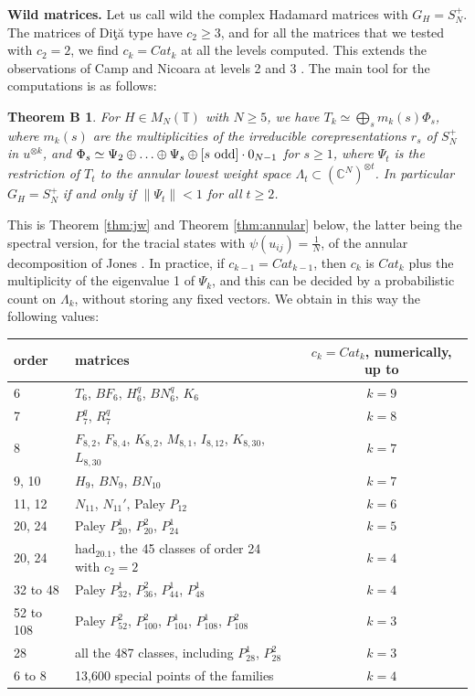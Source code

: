 \documentclass[11pt]{amsart}
\newtheorem*{thmB}{Theorem B}
\newcommand{\T}{\mathbb T}
\begin{document}
\medskip

\noindent\textbf{Wild matrices.} Let us call wild the complex Hadamard matrices with $G_H=S_N^+$. The matrices of Di\c t\u a type have $c_2\geq3$, and for all the matrices that we tested with $c_2=2$, we find $c_k=Cat_k$ at all the levels computed. This extends the observations of Camp and Nicoara at levels 2 and 3 \cite{cn}. The main tool for the computations is as follows:

\begin{thmB}
For $H\in M_N(\T)$ with $N\geq5$, we have $T_k\simeq\bigoplus_sm_k(s)\Phi_s$, where $m_k(s)$ are the multiplicities of the irreducible corepresentations $r_s$ of $S_N^+$ in $u^{\otimes k}$, and $\Phi_s\simeq\Psi_2\oplus\ldots\oplus\Psi_s\oplus[s\ {\rm odd}]\cdot0_{N-1}$ for $s\geq1$, where $\Psi_t$ is the restriction of $T_t$ to the annular lowest weight space $\Lambda_t\subset(\mathbb C^N)^{\otimes t}$. In particular $G_H=S_N^+$ if and only if $\|\Psi_t\|<1$ for all $t\geq2$.
\end{thmB}

This is Theorem \ref{thm:jw} and Theorem \ref{thm:annular} below, the latter being the spectral version, for the tracial states with $\psi(u_{ij})=\frac{1}{N}$, of the annular decomposition of Jones \cite{jo2}. In practice, if $c_{k-1}=Cat_{k-1}$, then $c_k$ is $Cat_k$ plus the multiplicity of the eigenvalue 1 of $\Psi_k$, and this can be decided by a probabilistic count on $\Lambda_k$, without storing any fixed vectors. We obtain in this way the following values:

\medskip

\begin{center}
\begin{tabular}{llc}
\toprule
order & matrices & $c_k=Cat_k$, numerically, up to\\
\midrule
6 & $T_6$, $BF_6$, $H_6^q$, $BN_6^q$, $K_6$ & $k=9$\\
7 & $P_7^q$, $R_7^q$ & $k=8$\\
8 & $F_{8,2}$, $F_{8,4}$, $K_{8,2}$, $M_{8,1}$, $I_{8,12}$, $K_{8,30}$, $L_{8,30}$ & $k=7$\\
9, 10 & $H_9$, $BN_9$, $BN_{10}$ & $k=7$\\
11, 12 & $N_{11}$, $N_{11}'$, Paley $P_{12}$ & $k=6$\\
20, 24 & Paley $P_{20}^1$, $P_{20}^2$, $P_{24}^1$ & $k=5$\\
20, 24 & $\mathrm{had}_{20.1}$, the 45 classes of order 24 with $c_2=2$ & $k=4$\\
32 to 48 & Paley $P_{32}^1$, $P_{36}^2$, $P_{44}^1$, $P_{48}^1$ & $k=4$\\
52 to 108 & Paley $P_{52}^2$, $P_{100}^2$, $P_{104}^1$, $P_{108}^1$, $P_{108}^2$ & $k=3$\\
28 & all the 487 classes, including $P_{28}^1$, $P_{28}^2$ & $k=3$\\
6 to 8 & 13,600 special points of the families & $k=4$\\
\bottomrule
\end{tabular}
\end{center}
\end{document}
